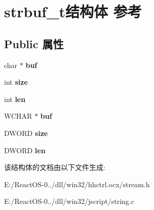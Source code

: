 \hypertarget{structstrbuf__t}{}\section{strbuf\+\_\+t结构体 参考}
\label{structstrbuf__t}
\subsection*{Public 属性}
\begin{DoxyCompactItemize}
\item 
\mbox{\label{structstrbuf__t_a3ff4db919297bdc15a02eeb8a33f957f}} 
char $\ast$ {\bfseries buf}
\item 
\mbox{\label{structstrbuf__t_a567b92657ba14d83907a10ca43491c28}} 
int {\bfseries size}
\item 
\mbox{\label{structstrbuf__t_a55a24b991523a47ab7c9aa9891584a5d}} 
int {\bfseries len}
\item 
\mbox{\label{structstrbuf__t_a31c0c96ca9d9ed9939246cdee014c535}} 
W\+C\+H\+AR $\ast$ {\bfseries buf}
\item 
\mbox{\label{structstrbuf__t_a4cd2b7bafbdbc30564ef7beef8b75727}} 
D\+W\+O\+RD {\bfseries size}
\item 
\mbox{\label{structstrbuf__t_aedae06fb2921ff7a97dccf346308457c}} 
D\+W\+O\+RD {\bfseries len}
\end{DoxyCompactItemize}


该结构体的文档由以下文件生成\+:\begin{DoxyCompactItemize}
\item 
E\+:/\+React\+O\+S-\/0../dll/win32/hhctrl.\+ocx/stream.\+h\item 
E\+:/\+React\+O\+S-\/0../dll/win32/jscript/string.\+c\end{DoxyCompactItemize}
